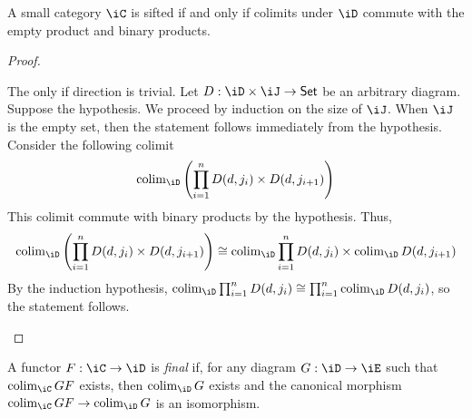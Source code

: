 \documentclass{zett}
\begin{document}
\begin{lem}\label{lem:sifted-empty-binary}%
  A small category $\iC$ is sifted if and only if colimits under $\iD$ commute with the empty product and binary products.
\end{lem}
\begin{proof}
  \begin{node}
    The only if direction is trivial.
    Let $D : \iD \times \iJ \to \CSet$ be an arbitrary diagram.
    Suppose the hypothesis.
    We proceed by induction on the size of $\iJ$.
    When $\iJ$ is the empty set, then the statement follows immediately from the hypothesis.
    Consider the following colimit
    \[
      \colim_{\iD}\left(\prod_{i=1}^{n}D(d, j_{i}) \times D(d, j_{i+1})\right)
    \]
    This colimit commute with binary products by the hypothesis.
    Thus,
    \[
      \colim_{\iD}\left(\prod_{i=1}^{n}D(d, j_{i}) \times D(d, j_{i+1})\right) \iso \colim_{\iD}\prod_{i=1}^{n}D(d, j_{i}) \times \colim_{\iD}D(d, j_{i+1})
    \]
    By the induction hypothesis, $\colim_{\iD}\prod_{i=1}^{n}D(d, j_{i}) \iso \prod_{i=1}^{n}\colim_{\iD}D(d, j_{i})$, so the statement follows.
  \end{node}
\end{proof}

\begin{defn}
  A functor $F : \iC \to \iD$ is \emph{final} if, for any diagram $G : \iD \to \iE$ such that $\colim_{\iC}GF$ exists, then $\colim_{\iD}G$ exists and the canonical morphism $\colim_{\iC}GF \to \colim_{\iD}G$ is an isomorphism.
\end{defn}
\end{document}

